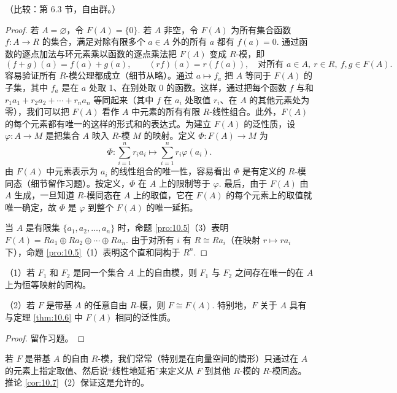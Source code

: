 （比较：第 6.3 节，自由群。）

\begin{proof}
若 \(A = \varnothing\)，令 \(F(A) = \{0\}\). 若 \(A\) 非空，令 \(F(A)\) 为所有集合函数 \(f : A \to R\) 的集合，满足对除有限多个 \(a \in A\) 外的所有 \(a\) 都有 \(f(a) = 0\). 通过函数的逐点加法与环元素乘以函数的逐点乘法把 \(F(A)\) 变成 \(R\)-模，即
\[
(f+g)(a) = f(a)+g(a), \qquad (rf)(a) = r(f(a)), \quad \text{对所有 } a \in A,\ r \in R,\ f, g \in F(A).
\]
容易验证所有 \(R\)-模公理都成立（细节从略）。通过 \(a \mapsto f_a\) 把 \(A\) 等同于 \(F(A)\) 的子集，其中 \(f_a\) 是在 \(a\) 处取 1、在别处取 0 的函数。这样，通过把每个函数 \(f\) 与和 \(r_1a_1+r_2a_2+\cdots+r_na_n\) 等同起来（其中 \(f\) 在 \(a_i\) 处取值 \(r_i\)、在 \(A\) 的其他元素处为零），我们可以把 \(F(A)\) 看作 \(A\) 中元素的所有有限 \(R\)-线性组合。此外，\(F(A)\) 的每个元素都有唯一的这样的形式和的表达式。为建立 \(F(A)\) 的泛性质，设 \(\varphi : A \to M\) 是把集合 \(A\) 映入 \(R\)-模 \(M\) 的映射。定义 \(\Phi : F(A) \to M\) 为
\[
\Phi : \sum_{i=1}^n r_ia_i \longmapsto \sum_{i=1}^n r_i\varphi(a_i).
\]
由 \(F(A)\) 中元素表示为 \(a_i\) 的线性组合的唯一性，容易看出 \(\Phi\) 是有定义的 \(R\)-模同态（细节留作习题）。按定义，\(\Phi\) 在 \(A\) 上的限制等于 \(\varphi\). 最后，由于 \(F(A)\) 由 \(A\) 生成，一旦知道 \(R\)-模同态在 \(A\) 上的取值，它在 \(F(A)\) 的每个元素上的取值就唯一确定，故 \(\Phi\) 是 \(\varphi\) 到整个 \(F(A)\) 的唯一延拓。

当 \(A\) 是有限集 \(\{a_1, a_2, \ldots, a_n\}\) 时，命题 \ref{pro:10.5}（3）表明 \(F(A) = Ra_1 \oplus Ra_2 \oplus \cdots \oplus Ra_n\). 由于对所有 \(i\) 有 \(R \cong Ra_i\)（在映射 \(r \mapsto ra_i\) 下），命题 \ref{pro:10.5}（1）表明这个直和同构于 \(R^n\).
\end{proof}

\begin{corollary}\label{cor:10.7}
（1）若 \(F_1\) 和 \(F_2\) 是同一个集合 \(A\) 上的自由模，则 \(F_1\) 与 \(F_2\) 之间存在唯一的在 \(A\) 上为恒等映射的同构。

（2）若 \(F\) 是带基 \(A\) 的任意自由 \(R\)-模，则 \(F \cong F(A)\). 特别地，\(F\) 关于 \(A\) 具有与定理 \ref{thm:10.6} 中 \(F(A)\) 相同的泛性质。
\end{corollary}

\begin{proof}
留作习题。
\end{proof}

若 \(F\) 是带基 \(A\) 的自由 \(R\)-模，我们常常（特别是在向量空间的情形）只通过在 \(A\) 的元素上指定取值、然后说“线性地延拓”来定义从 \(F\) 到其他 \(R\)-模的 \(R\)-模同态。推论 \ref{cor:10.7}（2）保证这是允许的。

